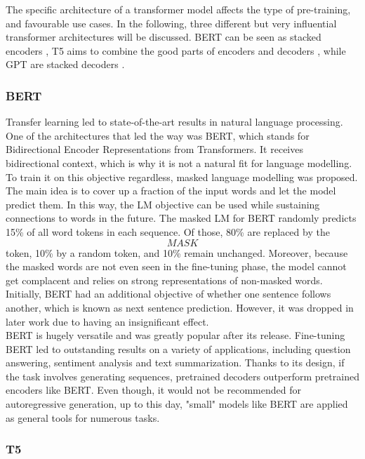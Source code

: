 \documentclass[
]{krantz}
\begin{document}
The specific architecture of a transformer model affects the type of
pre-training, and favourable use cases. In the following, three
different but very influential transformer architectures will be
discussed. BERT can be seen as stacked encoders \citep{Devlin2018}, T5 aims
to combine the good parts of encoders and decoders \citep{Raffel2019},
while GPT are stacked decoders \citep{brown2020language}.

\hypertarget{bert}{%
\subsubsection{BERT}\label{bert}}

Transfer learning led to state-of-the-art results in natural language
processing. One of the architectures that led the way was BERT, which
stands for Bidirectional Encoder Representations from Transformers. It
receives bidirectional context, which is why it is not a natural fit for
language modelling. To train it on this objective regardless, masked
language modelling was proposed. The main idea is to cover up a fraction
of the input words and let the model predict them. In this way, the LM
objective can be used while sustaining connections to words in the
future. The masked LM for BERT randomly predicts 15\% of all word tokens
in each sequence. Of those, 80\% are replaced by the \[MASK\] token, 10\%
by a random token, and 10\% remain unchanged. Moreover, because the
masked words are not even seen in the fine-tuning phase, the model
cannot get complacent and relies on strong representations of non-masked
words. Initially, BERT had an additional objective of whether one
sentence follows another, which is known as next sentence prediction.
However, it was dropped in later work due to having an insignificant
effect.\\

BERT is hugely versatile and was greatly popular after its release.
Fine-tuning BERT led to outstanding results on a variety of
applications, including question answering, sentiment analysis and text
summarization. Thanks to its design, if the task involves generating
sequences, pretrained decoders outperform pretrained encoders like BERT.
Even though, it would not be recommended for autoregressive generation,
up to this day, "small" models like BERT are applied as general tools
for numerous tasks.

\hypertarget{t5}{%
\subsubsection{T5}\label{t5}}
\end{document}
